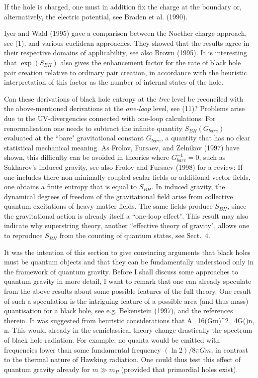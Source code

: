 If the hole is charged, one must in addition fix the charge at the
boundary or, alternatively, the electric potential, see
Braden et al. (1990).

\vskip 2mm
\small

Iyer and Wald (1995) gave a comparison between
the Noether charge approach, see (1), and various euclidean
approaches. They showed that the results agree in their respective
domains of applicability, see also Brown (1995).
It is interesting that $\exp(S_{BH})$ also gives the
enhancement factor for the rate of black hole pair creation
relative to ordinary pair creation, in accordance with
the heuristic interpretation of this factor as the number of internal
states of the hole.

\vskip 2mm
\normalsize
Can these derivations of black hole entropy at the {\em tree} level
be reconciled with the above-mentioned derivations at the
{\em one-loop} level, see (11)? Problems arise due to the 
UV-divergencies connected with one-loop calculations:
For renormalisation one needs to subtract the infinite quantity
$S_{BH}(G_{bare})$ evaluated at the ``bare" gravitational constant
$G_{bare}$, a quantity that has no clear statistical mechanical meaning.
As Frolov, Fursaev, and Zelnikov (1997) have shown, this difficulty
can be avoided in theories where $G_{bare}^{-1}=0$, such as
Sakharov's induced gravity, see also Frolov and Fursaev (1998)
for a review: If one includes there non-minimally coupled scalar fields
or additional vector fields, one obtains a finite entropy
that is equal to $S_{BH}$. In induced gravity, the dynamical degrees
of freedom of the gravitational field arise from collective
quantum excitations of heavy matter fields. The same fields
produce $S_{BH}$, since the gravitational action is already itself
a ``one-loop effect". This result may also indicate why
superstring theory, another ``effective theory of gravity",
allows one to reproduce $S_{BH}$ from the counting of
quantum states, see Sect.~4.

It was the intention of this section to give convincing arguments
that black holes must be quantum objects and that they can be
fundamentally understood only in the framework of quantum gravity.
Before I shall discuss some approaches to quantum gravity
in more detail, I want to remark that one can already speculate
from the above results about some possible features of the
full theory. One result of such a speculation is the intriguing
feature of a possible area (and thus mass) quantisation for
a black hole, see e.g. Bekenstein (1997), and the references 
therein. It was suggested from heuristic considerations that
\be A=16\pi(Gm)^2=4G()\hbar n, \quad n\in\bbbn \enspace .\ee
This would already in the semiclassical theory change drastically
the spectrum of black hole radiation. For example, no quanta
would be emitted with frequencies lower than some fundamental
frequency $(\ln 2)/8\pi Gm$, in contrast to the thermal nature
of Hawking radiation. One could thus test this effect of quantum gravity
already for $m\gg m_P$ (provided that primordial holes exist).

